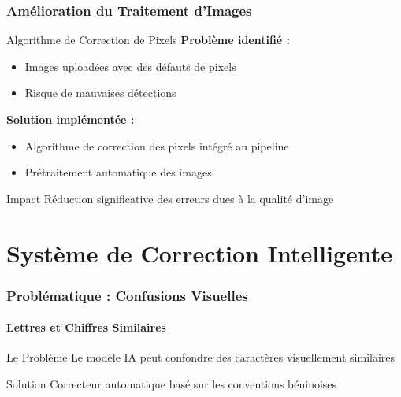 \documentclass[
	11pt,
	aspectratio=169,
]{beamer}
\begin{document}
\begin{frame}
	\frametitle{Amélioration du Traitement d'Images}
	
	\begin{block}{Algorithme de Correction de Pixels}
		\textbf{Problème identifié :}
		\begin{itemize}
			\item Images uploadées avec des défauts de pixels
			\item Risque de mauvaises détections
		\end{itemize}

		\smallskip
		
		\textbf{Solution implémentée :}
		\begin{itemize}
			\item Algorithme de correction des pixels intégré au pipeline
			\item Prétraitement automatique des images
		\end{itemize}
	\end{block}
	
	\smallskip
	
	\begin{alertblock}{Impact}
		Réduction significative des erreurs dues à la qualité d'image
	\end{alertblock}
\end{frame}


\section{Système de Correction Intelligente}

\begin{frame}
	\frametitle{Problématique : Confusions Visuelles}
	\framesubtitle{Lettres et Chiffres Similaires}
	
	\begin{alertblock}{Le Problème}
		Le modèle IA peut confondre des caractères visuellement similaires
	\end{alertblock}
	
	\begin{block}{Solution}
		\centering
		\alert{Correcteur automatique} basé sur les conventions béninoises
	\end{block}
\end{frame}
\end{document}

